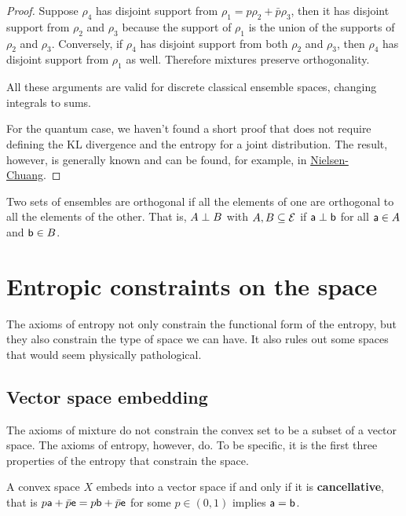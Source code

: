 \begin{proof}
	Suppose $\rho_4$ has disjoint support from $\rho_1 = p \rho_2 + \bar{p} \rho_3$, then it has disjoint support from $\rho_2$ and $\rho_3$ because the support of $\rho_1$ is the union of the supports of $\rho_2$ and $\rho_3$. Conversely, if $\rho_4$ has disjoint support from both $\rho_2$ and $\rho_3$, then $\rho_4$ has disjoint support from $\rho_1$ as well. Therefore mixtures preserve orthogonality.
	
	All these arguments are valid for discrete classical ensemble spaces, changing integrals to sums.
	
	For the quantum case, we haven't found a short proof that does not require defining the KL divergence and the entropy for a joint distribution. The result, however, is generally known and can be found, for example, in \href{https://www.cambridge.org/highereducation/books/quantum-computation-and-quantum-information/01E10196D0A682A6AEFFEA52D53BE9AE}{Nielsen-Chuang}.
\end{proof}

\begin{defn}
	Two sets of ensembles are orthogonal if all the elements of one are orthogonal to all the elements of the other. That is, $A \ortho B$ with $A, B \subseteq \Ens$ if $\ens[a] \ortho \ens[b]$ for all $\ens[a] \in A$ and $\ens[b] \in B$. 
\end{defn}

\section{Entropic constraints on the space}

The axioms of entropy not only constrain the functional form of the entropy, but they also constrain the type of space we can have. It also rules out some spaces that would seem physically pathological.

\subsection{Vector space embedding}

The axioms of mixture do not constrain the convex set to be a subset of a vector space. The axioms of entropy, however, do. To be specific, it is the first three properties of the entropy that constrain the space.

\begin{prop}
	A convex space $X$ embeds into a vector space if and only if it is \textbf{cancellative}, that is $p \ens[a] + \bar{p} \ens = p \ens[b] + \bar{p} \ens$ for some $p \in (0,1)$ implies $\ens[a] = \ens[b]$.
\end{prop}

